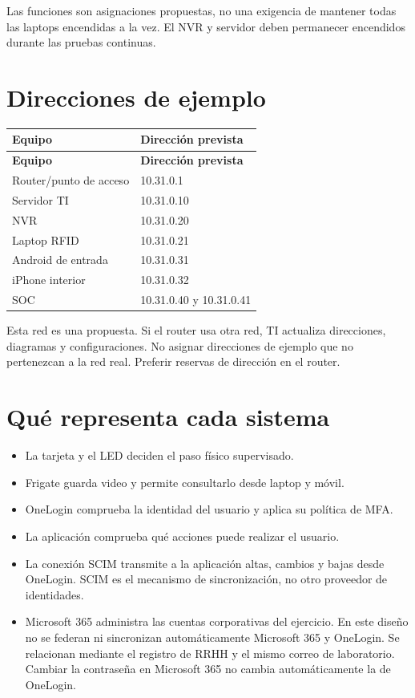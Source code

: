 \documentclass[12pt,a4paper]{article}
\begin{document}
Las funciones son asignaciones propuestas, no una exigencia de mantener todas las laptops encendidas a la vez. El NVR y servidor deben permanecer encendidos durante las pruebas continuas.\par
{}\section*{Direcciones de ejemplo}
{\small\renewcommand{\arraystretch}{1.2}
\begin{longtable}{p{7.760cm}p{7.760cm}}
\toprule
\textbf{Equipo} & \textbf{Dirección prevista} \\ \midrule\endfirsthead
\textbf{Equipo} & \textbf{Dirección prevista} \\ \midrule\endhead
Router/punto de acceso & 10.31.0.1 \\
Servidor TI & 10.31.0.10 \\
NVR & 10.31.0.20 \\
Laptop RFID & 10.31.0.21 \\
Android de entrada & 10.31.0.31 \\
iPhone interior & 10.31.0.32 \\
SOC & 10.31.0.40 y 10.31.0.41 \\
\bottomrule\end{longtable}}
Esta red es una propuesta. Si el router usa otra red, TI actualiza direcciones, diagramas y configuraciones. No asignar direcciones de ejemplo que no pertenezcan a la red real. Preferir reservas de dirección en el router.\par
{}\section*{Qué representa cada sistema}
\begin{itemize}
\item La tarjeta y el LED deciden el paso físico supervisado.
\item Frigate guarda video y permite consultarlo desde laptop y móvil.
\item OneLogin comprueba la identidad del usuario y aplica su política de MFA.
\item La aplicación comprueba qué acciones puede realizar el usuario.
\item La conexión SCIM transmite a la aplicación altas, cambios y bajas desde OneLogin. SCIM es el mecanismo de sincronización, no otro proveedor de identidades.
\item Microsoft 365 administra las cuentas corporativas del ejercicio. En este diseño no se federan ni sincronizan automáticamente Microsoft 365 y OneLogin. Se relacionan mediante el registro de RRHH y el mismo correo de laboratorio. Cambiar la contraseña en Microsoft 365 no cambia automáticamente la de OneLogin.
\end{itemize}
\end{document}
